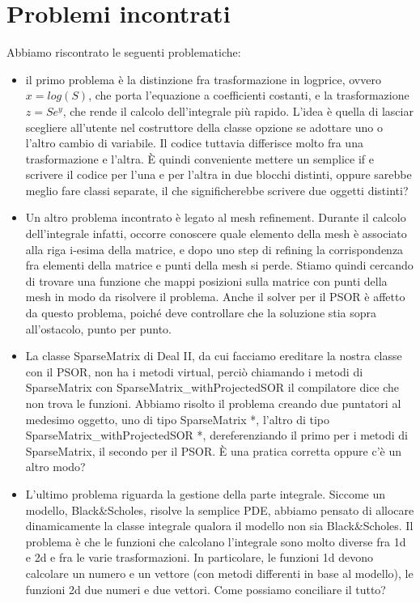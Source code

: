 \documentclass[a4paper,10pt]{article}
\begin{document}
\section{Problemi incontrati}
Abbiamo riscontrato le seguenti problematiche:
\begin{itemize}
\item{il primo problema \`e la distinzione fra trasformazione in logprice, ovvero $x=log(S)$, che porta l'equazione a coefficienti costanti, e la trasformazione $z=Se^y$, che rende il calcolo dell'integrale pi\`u rapido. L'idea \`e quella di lasciar scegliere all'utente nel costruttore della classe opzione se adottare uno o l'altro cambio di variabile. Il codice tuttavia differisce molto fra una trasformazione e l'altra. \`E quindi conveniente mettere un semplice \textsf{if} e scrivere il codice per l'una e per l'altra in due blocchi distinti, oppure sarebbe meglio fare classi separate, il che significherebbe scrivere due oggetti distinti?}
\item{Un altro problema incontrato \`e legato al mesh refinement. Durante il calcolo dell'integrale infatti, occorre conoscere quale elemento della mesh \`e associato alla riga i-esima della matrice, e dopo uno step di refining la corrispondenza fra elementi della matrice e punti della mesh si perde. Stiamo quindi cercando di trovare una funzione che mappi posizioni sulla matrice con punti della mesh in modo da risolvere il problema. Anche il solver per il PSOR \`e affetto da questo problema, poich\'e deve controllare che la soluzione stia sopra all'ostacolo, punto per punto.}
\item{La classe \textsf{SparseMatrix} di Deal II, da cui facciamo ereditare la nostra classe con il PSOR, non ha i metodi \textsf{virtual}, perci\`o chiamando i metodi di \textsf{SparseMatrix} con \textsf{SparseMatrix\_withProjectedSOR} il compilatore dice che non trova le funzioni. Abbiamo risolto il problema creando due puntatori al medesimo oggetto, uno di tipo \textsf{SparseMatrix *}, l'altro di tipo \textsf{SparseMatrix\_withProjectedSOR *}, dereferenziando il primo per i metodi di \textsf{SparseMatrix}, il secondo per il PSOR. \`E una pratica corretta oppure c'\`e un altro modo?}
\item{L'ultimo problema riguarda la gestione della parte integrale. Siccome un modello, Black\&Scholes, risolve la semplice PDE, abbiamo pensato di allocare dinamicamente la classe integrale qualora il modello non sia Black\&Scholes. Il problema \`e che le funzioni che calcolano l'integrale sono molto diverse fra 1d e 2d e fra le varie trasformazioni. In particolare, le funzioni 1d devono calcolare un numero e un vettore (con metodi differenti in base al modello), le funzioni 2d due numeri e due vettori. Come possiamo conciliare il tutto?}
\end{itemize}
\end{document}
